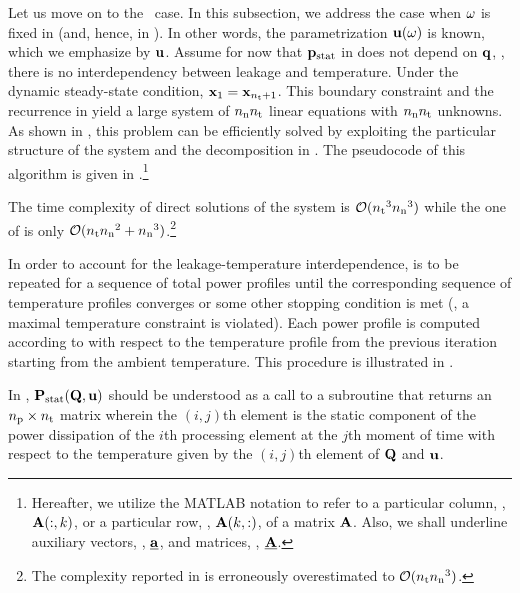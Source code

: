 Let us move on to the \dss\ case.
In this subsection, we address the case when $\omega$ is fixed in  (and, hence, in ).
In other words, the parametrization $\mathbf{u}(\omega)$ is known, which we emphasize by $\mathbf{u}$.
Assume for now that $\mathbf{p}_{\text{stat}}$ in  does not depend on $\mathbf{q}$, \ie, there is no interdependency between leakage and temperature.
Under the dynamic steady-state condition, $\mathbf{x}_1 = \mathbf{x}_{{n_\text{t}} + 1}$.
This boundary constraint and the recurrence in  yield a large system of ${n_\text{n}} {n_\text{t}}$ linear equations with ${n_\text{n}} {n_\text{t}}$ unknowns.
As shown in \cite{ukhov2012}, this problem can be efficiently solved by exploiting the particular structure of the system and the decomposition in .
The pseudocode of this algorithm is given in .\footnote{Hereafter, we utilize the MATLAB notation to refer to a particular column, \eg, $\mathbf{A}(:, k)$, or a particular row, \eg, $\mathbf{A}(k, :)$, of a matrix $\mathbf{A}$. Also, we shall underline auxiliary vectors, \eg, $\underline{\mathbf{a}}$, and matrices, \eg, $\underline{\mathbf{A}}$.}


The time complexity of direct solutions of the system is $\mathcal{O}({n_\text{t}}^3 {n_\text{n}}^3)$ while the one of  is only $\mathcal{O}({n_\text{t}} {n_\text{n}}^2 + {n_\text{n}}^3)$.\footnote{The complexity reported in \cite{ukhov2012} is erroneously overestimated to $\mathcal{O}({n_\text{t}} {n_\text{n}}^3)$.}

In order to account for the leakage-temperature interdependence,  is to be repeated for a sequence of total power profiles until the corresponding sequence of temperature profiles converges or some other stopping condition is met (\eg, a maximal temperature constraint is violated).
Each power profile is computed according to  with respect to the temperature profile from the previous iteration starting from the ambient temperature.
This procedure is illustrated in .


In , $\mathbf{P}_{\text{stat}}(\mathbf{Q}, \mathbf{u})$ should be understood as a call to a subroutine that returns an ${n_\text{p}} \times {n_\text{t}}$ matrix wherein the $(i, j)$th element is the static component of the power dissipation of the $i$th processing element at the $j$th moment of time with respect to the temperature given by the $(i, j)$th element of $\mathbf{Q}$ and $\mathbf{u}$.
